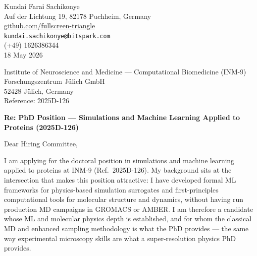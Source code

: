 \documentclass[12pt,a4paper]{article}
\begin{document}
\begin{flushright}
Kundai Farai Sachikonye \\
Auf der Lichtung 19, 82178 Puchheim, Germany \\
\href{https://github.com/fullscreen-triangle}{github.com/fullscreen-triangle} \\
\texttt{kundai.sachikonye@bitspark.com} \\
(+49) 1626386344 \\[6pt]
18 May 2026
\end{flushright}

\vspace{1em}

Institute of Neuroscience and Medicine --- Computational Biomedicine (INM-9) \\
Forschungszentrum Jülich GmbH \\
52428 Jülich, Germany \\
Reference: 2025D-126

\vspace{1.5em}

\textbf{Re: PhD Position --- Simulations and Machine Learning Applied to Proteins (2025D-126)}

\vspace{1em}

Dear Hiring Committee,

I am applying for the doctoral position in simulations and machine learning applied
to proteins at INM-9 (Ref.\ 2025D-126). My background sits at the intersection
that makes this position attractive: I have developed formal ML frameworks for
physics-based simulation surrogates and first-principles computational tools
for molecular structure and dynamics, without having run production MD campaigns
in GROMACS or AMBER. I am therefore a candidate whose ML and molecular physics
depth is established, and for whom the classical MD and enhanced sampling methodology
is what the PhD provides --- the same way experimental microscopy skills are what
a super-resolution physics PhD provides.
\end{document}
